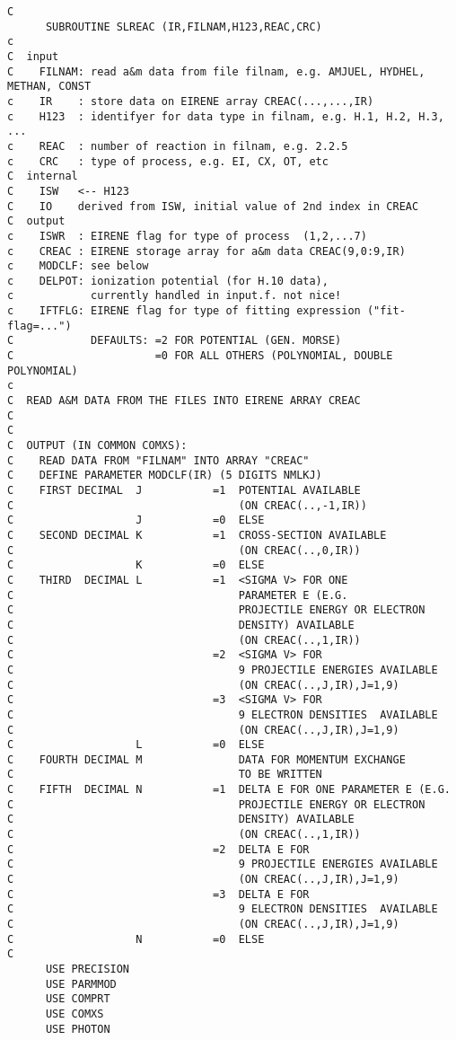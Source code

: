 \documentclass[12pt,dvipdfmx]{article}
\begin{document}
\begin{small}\begin{verbatim}
C
      SUBROUTINE SLREAC (IR,FILNAM,H123,REAC,CRC)
c
C  input
C    FILNAM: read a&m data from file filnam, e.g. AMJUEL, HYDHEL, METHAN, CONST
c    IR    : store data on EIRENE array CREAC(...,...,IR)
c    H123  : identifyer for data type in filnam, e.g. H.1, H.2, H.3, ...
c    REAC  : number of reaction in filnam, e.g. 2.2.5
c    CRC   : type of process, e.g. EI, CX, OT, etc
C  internal
C    ISW   <-- H123
C    IO    derived from ISW, initial value of 2nd index in CREAC
C  output
c    ISWR  : EIRENE flag for type of process  (1,2,...7)
c    CREAC : EIRENE storage array for a&m data CREAC(9,0:9,IR)
c    MODCLF: see below
c    DELPOT: ionization potential (for H.10 data),
c            currently handled in input.f. not nice!
c    IFTFLG: EIRENE flag for type of fitting expression ("fit-flag=...")
C            DEFAULTS: =2 FOR POTENTIAL (GEN. MORSE)
C                      =0 FOR ALL OTHERS (POLYNOMIAL, DOUBLE POLYNOMIAL)
c
C  READ A&M DATA FROM THE FILES INTO EIRENE ARRAY CREAC
C
C
C  OUTPUT (IN COMMON COMXS):
C    READ DATA FROM "FILNAM" INTO ARRAY "CREAC"
C    DEFINE PARAMETER MODCLF(IR) (5 DIGITS NMLKJ)
C    FIRST DECIMAL  J           =1  POTENTIAL AVAILABLE
C                                   (ON CREAC(..,-1,IR))
C                   J           =0  ELSE
C    SECOND DECIMAL K           =1  CROSS-SECTION AVAILABLE
C                                   (ON CREAC(..,0,IR))
C                   K           =0  ELSE
C    THIRD  DECIMAL L           =1  <SIGMA V> FOR ONE
C                                   PARAMETER E (E.G.
C                                   PROJECTILE ENERGY OR ELECTRON
C                                   DENSITY) AVAILABLE
C                                   (ON CREAC(..,1,IR))
C                               =2  <SIGMA V> FOR
C                                   9 PROJECTILE ENERGIES AVAILABLE
C                                   (ON CREAC(..,J,IR),J=1,9)
C                               =3  <SIGMA V> FOR
C                                   9 ELECTRON DENSITIES  AVAILABLE
C                                   (ON CREAC(..,J,IR),J=1,9)
C                   L           =0  ELSE
C    FOURTH DECIMAL M               DATA FOR MOMENTUM EXCHANGE
C                                   TO BE WRITTEN
C    FIFTH  DECIMAL N           =1  DELTA E FOR ONE PARAMETER E (E.G.
C                                   PROJECTILE ENERGY OR ELECTRON
C                                   DENSITY) AVAILABLE
C                                   (ON CREAC(..,1,IR))
C                               =2  DELTA E FOR
C                                   9 PROJECTILE ENERGIES AVAILABLE
C                                   (ON CREAC(..,J,IR),J=1,9)
C                               =3  DELTA E FOR
C                                   9 ELECTRON DENSITIES  AVAILABLE
C                                   (ON CREAC(..,J,IR),J=1,9)
C                   N           =0  ELSE
C
      USE PRECISION
      USE PARMMOD
      USE COMPRT
      USE COMXS
      USE PHOTON


\end{verbatim}
\end{small}
\end{document}
